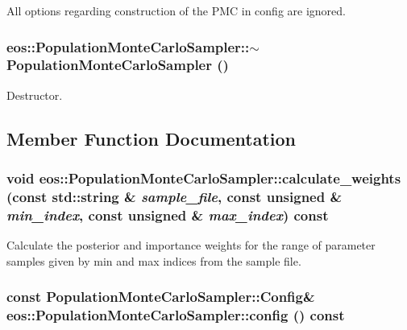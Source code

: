 All options regarding construction of the PMC in config are ignored. \hypertarget{classeos_1_1PopulationMonteCarloSampler_a10bebcfd46a9a9c8925de30e78f192ef}{
\subsubsection[{$\sim$PopulationMonteCarloSampler}]{\setlength{\rightskip}{0pt plus 5cm}eos::PopulationMonteCarloSampler::$\sim$PopulationMonteCarloSampler ()}}
\label{classeos_1_1PopulationMonteCarloSampler_a10bebcfd46a9a9c8925de30e78f192ef}


Destructor. 

\subsection{Member Function Documentation}
\hypertarget{classeos_1_1PopulationMonteCarloSampler_acce93bba46d62aba651ccbf9dd7dd97e}{
\subsubsection[{calculate\_\-weights}]{\setlength{\rightskip}{0pt plus 5cm}void eos::PopulationMonteCarloSampler::calculate\_\-weights (const std::string \& {\em sample\_\-file}, \/  const unsigned \& {\em min\_\-index}, \/  const unsigned \& {\em max\_\-index}) const}}
\label{classeos_1_1PopulationMonteCarloSampler_acce93bba46d62aba651ccbf9dd7dd97e}
Calculate the posterior and importance weights for the range of parameter samples given by min and max indices from the sample file. \hypertarget{classeos_1_1PopulationMonteCarloSampler_ad5cdbdb944ffd933a76b58915c366ecc}{
\subsubsection[{config}]{\setlength{\rightskip}{0pt plus 5cm}const {\bf PopulationMonteCarloSampler::Config}\& eos::PopulationMonteCarloSampler::config () const}}
\label{classeos_1_1PopulationMonteCarloSampler_ad5cdbdb944ffd933a76b58915c366ecc}


